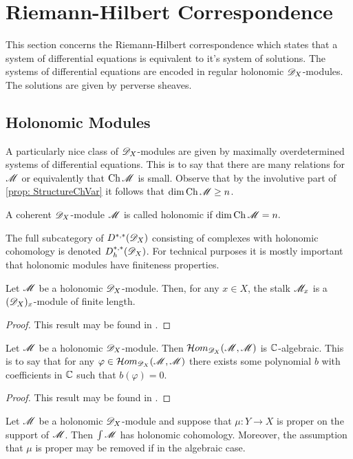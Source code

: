 \section{Riemann-Hilbert Correspondence}\label{sec: Riemann-Hilbert}
This section concerns the Riemann-Hilbert correspondence which states that a system of differential equations is equivalent to it's system of solutions.
The systems of differential equations are encoded in regular holonomic $\mathscr{D}_X$-modules.
The solutions are given by perverse sheaves.
\subsection{Holonomic Modules}
A particularly nice class of $\mathscr{D}_X$-modules are given by maximally overdetermined systems of differential equations.
This is to say that there are many relations for $\mathscr{M}$ or equivalently that $\operatorname{Ch}\mathscr{M}$ is small.
Observe that by the involutive part of \cref{prop: StructureChVar} it follows that $\dim \operatorname{Ch}\mathscr{M} \geq n$.
\begin{definition}
  A coherent $\mathscr{D}_X$-module $\mathscr{M}$ is called holonomic if
  $\dim \operatorname{Ch} \mathscr{M}  = n.$
\end{definition}
The full subcategory of $D^{*,*}(\mathscr{D}_X)$ consisting of complexes with holonomic cohomology is denoted $D_h^{*,*}(\mathscr{D}_X)$.
For technical purposes it is mostly important that holonomic modules have finiteness properties.
\begin{proposition}\label{prop: FiniteLength}
  Let $\mathscr{M}$ be a holonomic $\mathscr{D}_X$-module. Then, for any $x\in X$, the stalk $\mathscr{M}_x$ is a $(\mathscr{D}_X)_x$-module of finite length.
\end{proposition}
\begin{proof}
  This result may be found in \cite[Chapter 4]{kashiwara2003d}.
\end{proof}
\begin{proposition}\label{prop: HomAlgebraic}
  Let $\mathscr{M}$ be a holonomic $\mathscr{D}_X$-module. Then $\mathcal{H}om_{\mathscr{D}_X}(\mathscr{M},\mathscr{M})$ is $\mathbb{C}$-algebraic. This is to say that for any $\varphi \in\mathcal{H}om_{\mathscr{D}_X}(\mathscr{M},\mathscr{M}) $ there exists some polynomial $b$ with coefficients in $\mathbb{C}$ such that $b(\varphi)=0$.
\end{proposition}
\begin{proof}
  This result may be found in \cite[Chapter 5]{bjork1979rings}.
\end{proof}
\begin{proposition}
  Let $\mathscr{M}$ be a holonomic $\mathscr{D}_X$-module and suppose that $\mu:Y\to X$ is proper on the support of $\mathscr{M}$. Then $\int \mathscr{M}$ has holonomic cohomology. Moreover, the assumption that $\mu$ is proper may be removed if in the algebraic case.
\end{proposition}
